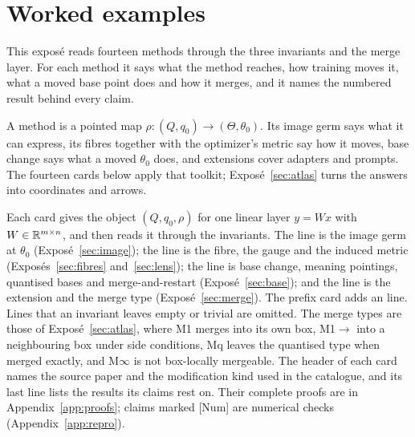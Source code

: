 \section{Worked examples}\label{sec:examples}

\newcommand{\exVIIlabel}[1]{{\sffamily\footnotesize\bfseries\color{inkgray}\textls[80]{\MakeUppercase{#1}}}}
\newcommand{\exVIIsrc}[2]{{\small\color{inkgray}#1\enspace\textperiodcentered\enspace{\sffamily\footnotesize #2}}}
\newcommand{\exVIIrefs}[1]{\par\smallskip\noindent{\footnotesize\color{inkgray}{\sffamily\bfseries Results.}\ #1}}
\newenvironment{exVIIlines}
  {\begin{description}[leftmargin=0pt,labelindent=0pt,itemsep=3pt,topsep=2pt,font=\exVIIlabel]}
  {\end{description}}

This exposé reads fourteen methods through the three invariants and the merge layer. For each method it says what the
method reaches, how training moves it, what a moved base point does and how it merges, and it names the numbered
result behind every claim.

A method is a pointed map $\rho:(Q,q_0)\to(\Theta,\theta_0)$. Its image germ says what it can express, its fibres
together with the optimizer's metric say how it moves, base change says what a moved $\theta_0$ does, and extensions
cover adapters and prompts. The fourteen cards below apply that toolkit; Exposé~\ref{sec:atlas} turns the answers into
coordinates and arrows.

Each card gives the object $(Q,q_0,\rho)$ for one linear layer $y=Wx$ with $W\in\mathbb{R}^{m\times n}$, and then reads it
through the invariants. The \exVIIlabel{Image} line is the image germ at $\theta_0$ (Exposé~\ref{sec:image}); the
\exVIIlabel{Fibre} line is the fibre, the gauge and the induced metric (Exposés~\ref{sec:fibres} and~\ref{sec:lens});
the \exVIIlabel{Base} line is base change, meaning pointings, quantised bases and merge-and-restart
(Exposé~\ref{sec:base}); and the \exVIIlabel{Merge} line is the extension and the merge type
(Exposé~\ref{sec:merge}). The prefix card adds an \exVIIlabel{Arrows} line. Lines that an invariant leaves empty or
trivial are omitted. The merge types are those of Exposé~\ref{sec:atlas}, where M1 merges into its own box, M1$\to$ into a
neighbouring box under side conditions, Mq leaves the quantised type when merged exactly, and M$\infty$ is not
box-locally mergeable. The header of each card names the source paper and the modification kind used in the
catalogue, and its last line lists the results its claims rest on. Their complete proofs are in
Appendix~\ref{app:proofs}; claims marked [Num] are numerical checks (Appendix~\ref{app:repro}).

